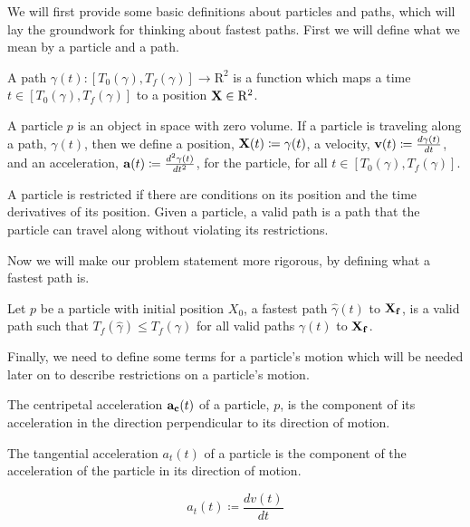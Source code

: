 We will first provide some basic definitions about particles and paths, which will lay the groundwork for thinking about fastest paths. First we will define what we mean by a particle and a path.

\begin{definition}
  A path $\gamma(t): [T_0(\gamma), T_f(\gamma)] \to \mathrm{R}^2$ is a function which maps a time $t \in [T_0(\gamma), T_f(\gamma)]$ to a position $\mathbf{X} \in \mathrm{R}^2$.
\end{definition}

\begin{definition}
  A particle $p$ is an object in space with zero volume. If a particle is traveling along a path, $\gamma(t)$, then we define a position, $\mathbf{X}(t) \coloneqq \gamma(t)$, a velocity, $\mathbf{v}(t) \coloneqq \frac{d\gamma(t)}{dt}$, and an acceleration, $\mathbf{a}(t) \coloneqq \frac{d^2\gamma(t)}{dt^2}$, for the particle, for all $t \in [T_0(\gamma), T_f(\gamma)]$.

  A particle is restricted if there are conditions on its position and the time derivatives of its position. Given a particle, a valid path is a path that the particle can travel along without violating its restrictions.
\end{definition}

Now we will make our problem statement more rigorous, by defining what a fastest path is.

\begin{definition}
  Let $p$ be a particle with initial position $X_0$, a fastest path $\hat{\gamma}(t)$ to $\mathbf{X_f}$, is a valid path such that $T_f(\hat{\gamma}) \leq T_f(\gamma)$ for all valid paths $\gamma(t)$ to $\mathbf{X_f}$.
\end{definition}

Finally, we need to define some terms for a particle's motion which will be needed later on to describe restrictions on a particle's motion.

\begin{definition}
  The centripetal acceleration $\mathbf{a_c}(t)$ of a particle, $p$, is the component of its acceleration in the direction perpendicular to its direction of motion.
\end{definition}

\begin{definition}
  The tangential acceleration $a_t(t)$ of a particle is the component of the acceleration of the particle in its direction of motion.

  \begin{equation}
    a_t(t) \coloneqq \frac{dv(t)}{dt}
  \end{equation}
\end{definition}

